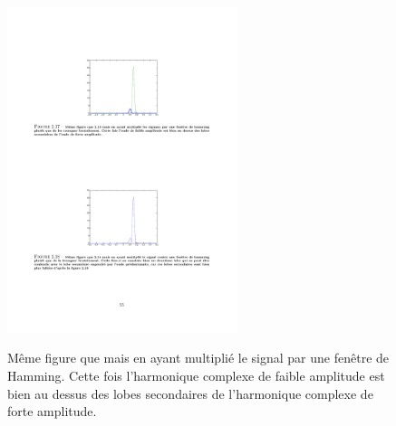 \begin{definition}
\begin{figure}
  \centering
  \includegraphics[width=0.6\textwidth]{Figures/Figure2-17}\\
  \caption{M\^{e}me figure que  mais en ayant multipli\'{e} le signal par une fen\^{e}tre de Hamming. Cette fois l'harmonique complexe de faible amplitude est bien au dessus des lobes secondaires de l'harmonique complexe de forte amplitude.}\label{fig:figure2-17}
\end{figure}



\end{definition}
